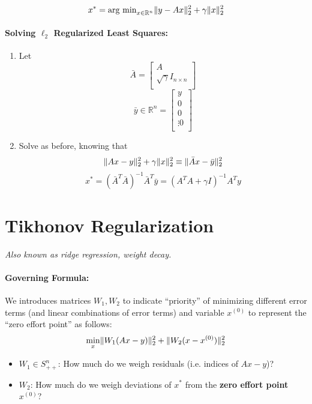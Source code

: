 \documentclass[a4paper,12pt]{report}
\DeclarePairedDelimiter\norm{\lVert}{\rVert}%
\begin{document}
\begin{equation}
x^* = \text{arg min}_{x\in \mathbb{R}^n} \norm{y-Ax}_2^2 + \gamma \norm{x}_2^2
\end{equation}

\paragraph{Solving $\ell_2$ Regularized Least Squares:} 
\begin{enumerate}
\item Let 
\begin{equation}
\bar A = 
	\begin{bmatrix}
		A \\
		\sqrt \gamma I_{n\times n}\\
	\end{bmatrix}
\end{equation}
\begin{equation}
\bar y \in \mathbb{R}^n = \begin{bmatrix}
y \\
0 \\
0 \\
\vdots 
0 \\
\end{bmatrix}
\end{equation}

\item Solve as before, knowing that 
\begin{equation}
\norm{Ax-y}_2^2 + \gamma \norm{x}_2^2 \equiv \norm{\bar A x - \bar y}_2^2
\end{equation}
\begin{equation}
x^* = (\bar A^T \bar A)^{-1} \bar A^T \bar y = (A^T A + \gamma I)^{-1} A^T y
\end{equation}
\end{enumerate}


\section{Tikhonov Regularization}

\textit{Also known as ridge regression, weight decay.} 

\paragraph{Governing Formula: } We introduces matrices $W_1, W_2$ to indicate ``priority'' of minimizing different error terms (and linear combinations of error terms) and variable $x^{(0)}$ to represent the ``zero effort point'' as follows:
\begin{equation}
\min_x \norm{W_1(Ax-y)}_2^2 + \norm{W_2 (x-x^{(0)})}_2^2
\end{equation}
\begin{itemize}
\item $W_1 \in S_{++}^n$: How much do we weigh residuals (i.e. indices of $Ax-y$)?
\item $W_2$: How much do we weigh deviations of $x^*$ from the \textbf{zero effort point} $x^{(0)}$?
\end{itemize}
\end{document}
